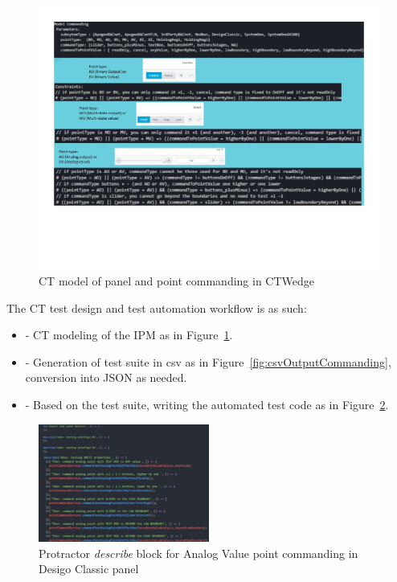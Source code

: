 \documentclass[conference]{IEEEtran}
\begin{document}
	\begin{figure}[!ht]
		\centering
			\includegraphics[width=1.00\textwidth,]{modelCommanding.pdf}
			\caption{CT model of panel and point commanding in CTWedge}
			\label{fig:modelCommanding}
	\end{figure}


	The CT test design and test automation workflow is as such:
	\begin{itemize}
		\item [] - CT modeling of the IPM as in Figure~\ref{fig:modelCommanding}.
		\item [] - Generation of test suite in csv as in Figure~\ref{fig:csvOutputCommanding}, conversion into JSON as needed.
		\item [] - Based on the test suite, writing the automated test code as in Figure~\ref{fig:pointCommandingTestCode}.
	\end{itemize}

	\begin{figure}[!h]
		\includegraphics[width=0.50\textwidth,]{pointCommandingTestCode.pdf}
		\caption{Protractor \textit{describe} block for Analog Value point commanding in Desigo Classic panel}
		\label{fig:pointCommandingTestCode}
	\end{figure}
\end{document}
